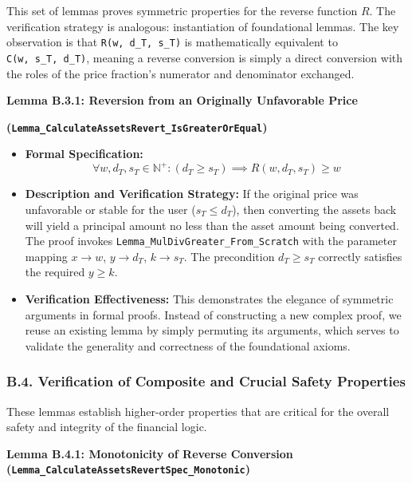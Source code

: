\documentclass[
  english,
  onecolumn]{article}
\providecommand{\tightlist}{%
  \setlength{\itemsep}{0pt}\setlength{\parskip}{0pt}}
\begin{document}
This set of lemmas proves symmetric properties for the reverse function
\(R\). The verification strategy is analogous: instantiation of
foundational lemmas. The key observation is that
\texttt{R(w,\ d\_T,\ s\_T)} is mathematically equivalent to
\texttt{C(w,\ s\_T,\ d\_T)}, meaning a reverse conversion is simply a
direct conversion with the roles of the price fraction's numerator and
denominator exchanged.

\textbf{Lemma B.3.1: Reversion from an Originally Unfavorable Price}

\textbf{(\texttt{Lemma\_CalculateAssetsRevert\_IsGreaterOrEqual})}

\begin{itemize}
\tightlist
\item
  \textbf{Formal Specification:}
  \[ \forall w, d_T, s_T \in \mathbb{N}^+ : (d_T \ge s_T) \implies R(w, d_T, s_T) \ge w \]
\item
  \textbf{Description and Verification Strategy:} If the original price
  was unfavorable or stable for the user (\(s_T \le d_T\)), then
  converting the assets back will yield a principal amount no less than
  the asset amount being converted. The proof invokes
  \texttt{Lemma\_MulDivGreater\_From\_Scratch} with the parameter
  mapping \(x \to w\), \(y \to d_T\), \(k \to s_T\). The precondition
  \(d_T \ge s_T\) correctly satisfies the required \(y \ge k\).
\item
  \textbf{Verification Effectiveness:} This demonstrates the elegance of
  symmetric arguments in formal proofs. Instead of constructing a new
  complex proof, we reuse an existing lemma by simply permuting its
  arguments, which serves to validate the generality and correctness of
  the foundational axioms.
\end{itemize}

\subsubsection{B.4. Verification of Composite and Crucial Safety
Properties}\label{b.4.-verification-of-composite-and-crucial-safety-properties}

These lemmas establish higher-order properties that are critical for the
overall safety and integrity of the financial logic.

\textbf{Lemma B.4.1: Monotonicity of Reverse Conversion
(\texttt{Lemma\_CalculateAssetsRevertSpec\_Monotonic})}
\end{document}
